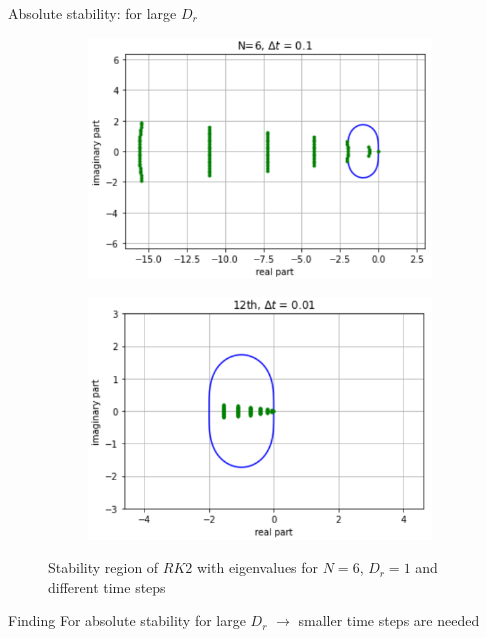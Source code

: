 \begin{frame}{Absolute stability: for large $D_r$}
	\begin{figure}
		\begin{subfigure}{0.48\textwidth}
			\includegraphics[width=\linewidth]{Bilder_wx/Stability/RK2_region_12th_dr=1_dt=0.1}
		\end{subfigure}
		\hfill
		\begin{subfigure}{0.48\textwidth}
			\includegraphics[width=\linewidth]{Bilder_wx/Stability/RK2_region_12th_dr=1_dt=0.01}
		\end{subfigure}
		\caption{Stability region of $RK2$ with eigenvalues for $N=6$, $D_r=1$ and different time steps}
	\end{figure}
	
	\begin{block}{Finding}
		For absolute stability for large $D_r$  $\rightarrow$ smaller time steps are needed
	\end{block}
\end{frame}